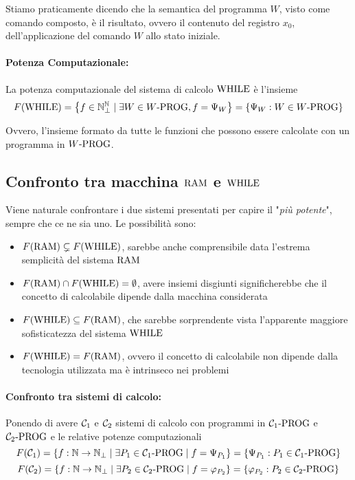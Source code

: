 Stiamo praticamente dicendo che la semantica del programma $W$, visto come comando composto, è il risultato, ovvero il contenuto del registro $x_0$, dell'applicazione del comando $W$ allo stato iniziale.

\paragraph{Potenza Computazionale:} La potenza computazionale del sistema di calcolo $\text{WHILE}$ è l'insieme 
$$ F(\text{WHILE}) = \left\{f \in \mathbb{N}^{\mathbb{N}}_\bot \mid  \exists W \in W\text{-PROG} , f = \Psi_W \right\} = \left\{\Psi_W : W \in W\text{-PROG} \right\}$$

Ovvero, l'insieme formato da tutte le funzioni che possono essere calcolate con un programma in $W\text{-PROG}$.

\subsection{Confronto tra macchina $\text{RAM}$ e $\text{WHILE}$}

Viene naturale confrontare i due sistemi presentati per capire il "\textit{più potente}", sempre che ce ne sia uno. Le possibilità sono: 
\begin{itemize}
	\item $F(\text{RAM}) \subsetneq F(\text{WHILE})$, sarebbe anche comprensibile data l'estrema semplicità del sistema $\text{RAM}$
	
    \item $F(\text{RAM}) \cap F(\text{WHILE}) = \emptyset$, avere insiemi disgiunti significherebbe che il concetto di calcolabile dipende dalla macchina considerata
	
    \item $F(\text{WHILE}) \subseteq F(\text{RAM})$, che sarebbe sorprendente vista l'apparente maggiore sofisticatezza del sistema $\text{WHILE}$
	
    \item $F(\text{WHILE}) = F(\text{RAM})$, ovvero il concetto di calcolabile non dipende dalla tecnologia utilizzata ma è intrinseco nei problemi
\end{itemize}

\paragraph{Confronto tra sistemi di calcolo:} Ponendo di avere $\mathcal{C}_1$ e $\mathcal{C}_2$ sistemi di calcolo con programmi in $\mathcal{C}_{1}\text{-}\text{PROG}$ e $\mathcal{C}_{2}\text{-}\text{PROG}$ e le relative potenze computazionali
$$ F(\mathcal{C}_1) = \left\{f: \mathbb{N} \rightarrow \mathbb{N}_\bot \mid \exists P_1 \in \mathcal{C}_{1}\text{-}\text{PROG} \mid f = \Psi_{P_1} \right\} = \left\{\Psi_{P_1}: P_1 \in \mathcal{C}_{1}\text{-}\text{PROG} \right\} $$
$$ F(\mathcal{C}_2) = \left\{f: \mathbb{N} \rightarrow \mathbb{N}_\bot \mid \exists P_2 \in \mathcal{C}_{2}\text{-}\text{PROG} \mid f = \varphi_{P_2} \right\} = \left\{\varphi_{P_2}: P_2 \in \mathcal{C}_{2}\text{-}\text{PROG} \right\} $$

